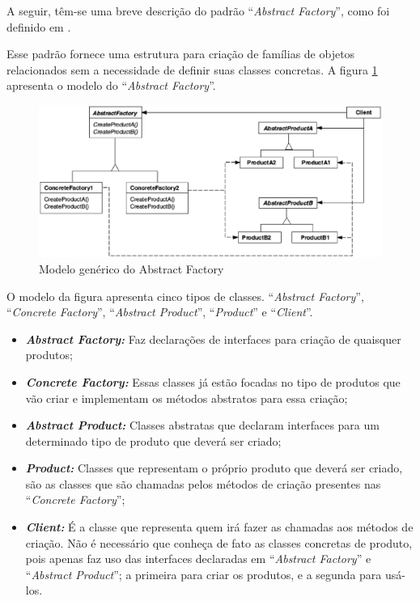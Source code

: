 \begin{apendicesenv}
A seguir, têm-se uma breve descrição do padrão ``\textit{Abstract Factory}'', como foi definido em \cite{Gamma:1995}.

Esse padrão fornece uma estrutura para criação de famílias de objetos relacionados sem a necessidade de definir suas classes concretas. A figura \ref{abstract_factory} apresenta o modelo do ``\textit{Abstract Factory}''.

\begin{figure}[!h]
	\centering
	\includegraphics[scale=0.5]{figuras/apendices/abstract_factory.eps}
	\caption[Modelo genérico do Abstract Factory]{Modelo genérico do Abstract Factory \cite{Gamma:1995}}
	\label{abstract_factory}
\end{figure}

O modelo da figura apresenta cinco tipos de classes. ``\textit{Abstract Factory}'', ``\textit{Concrete Factory}'', ``\textit{Abstract Product}'', ``\textit{Product}'' e ``\textit{Client}''.

\begin{itemize}
	\item \textbf{\textit{Abstract Factory:}} Faz declarações de interfaces para criação de quaisquer produtos;
	\item \textbf{\textit{Concrete Factory:}} Essas classes já estão focadas no tipo de produtos que vão criar e implementam os métodos abstratos para essa criação;
	\item \textbf{\textit{Abstract Product:}} Classes abstratas que declaram interfaces para um determinado tipo de produto que deverá ser criado;
	\item \textbf{\textit{Product:}} Classes que representam o próprio produto que deverá ser criado, são as classes que são chamadas pelos métodos de criação presentes nas ``\textit{Concrete Factory}'';
	\item \textbf{\textit{Client:}} É a classe que representa quem irá fazer as chamadas aos métodos de criação. Não é necessário que conheça de fato as classes concretas de produto, pois apenas faz uso das interfaces declaradas em ``\textit{Abstract Factory}'' e ``\textit{Abstract Product}''; a primeira para criar os produtos, e a segunda para usá-los.
\end{itemize}


\end{apendicesenv}
